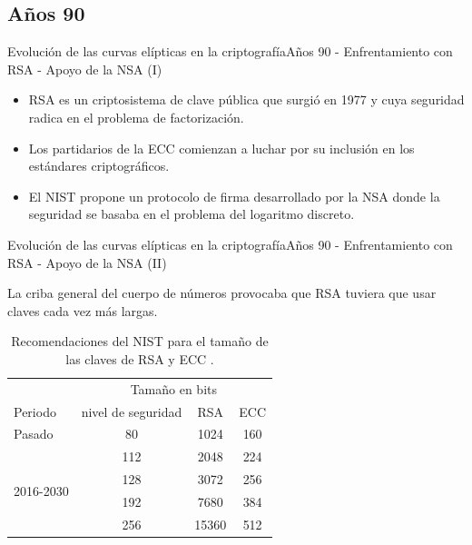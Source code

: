 \documentclass[spanish]{beamer}
\begin{document}
\subsection{Años 90}
\begin{frame}[fragile]{Evolución de las curvas elípticas en la criptografía}{Años 90 - Enfrentamiento con RSA - Apoyo de la NSA (I)}
  \begin{itemize}
    \item RSA es un criptosistema de clave pública que surgió en 1977 y cuya seguridad radica en el problema de factorización. %
    \item Los partidarios de la ECC comienzan a luchar por su inclusión en los estándares criptográficos. %
    \item El NIST propone un protocolo de firma desarrollado por la NSA donde la seguridad se basaba en el problema del logaritmo discreto.%
    \end{itemize}
    \end{frame}
\begin{frame}[fragile]{Evolución de las curvas elípticas en la criptografía}{Años 90 - Enfrentamiento con RSA - Apoyo de la NSA (II)}

	La criba general del cuerpo de números provocaba que RSA tuviera que usar claves cada vez más largas. %

\begin{table}[h]
  \centering
  \sffamily
  \begin{tabular}{lccc}
    \toprule
     & \multicolumn{3}{c}{Tamaño en bits} \\
    Periodo & nivel de seguridad & RSA & ECC \\
    \midrule
    Pasado & 80 & 1024 & 160\\
    \multirow[t]{4}{*}{2016-2030} & 112 & 2048 & 224\\
     & 128 & 3072 & 256\\
     & 192 & 7680 & 384\\
     & 256 & 15360 & 512\\
    \bottomrule
  \end{tabular}
  \caption{Recomendaciones del NIST para el tamaño de las claves de RSA y ECC \parencite{barker_recommendation_2016}.}
  \label{tab:rsa-ecc-nist}
\end{table} %
\end{frame}
\end{document}

